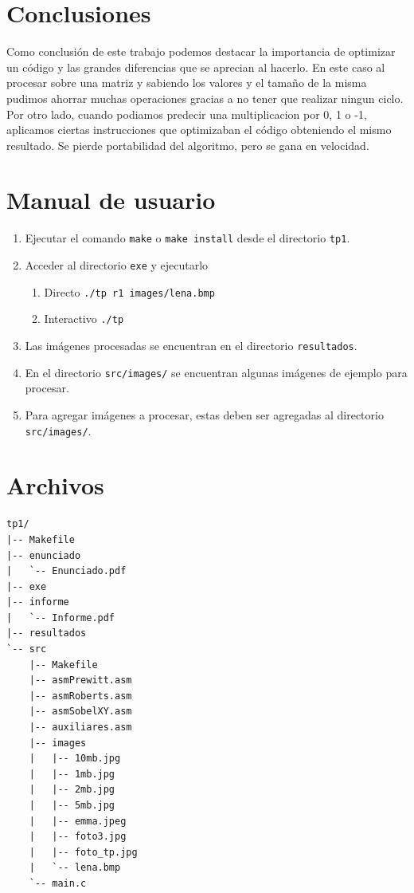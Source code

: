 \documentclass[a4paper, 10pt]{article}
\begin{document}
\newpage

\section{Conclusiones}
Como conclusi\'on de este trabajo podemos destacar la importancia de optimizar un c\'odigo y las grandes diferencias que se aprecian al hacerlo. En este caso al procesar sobre una matriz y sabiendo los valores y el tama\~no de la misma pudimos ahorrar muchas operaciones gracias a no tener que realizar ningun ciclo. 
Por otro lado, cuando podiamos predecir una multiplicacion por 0, 1 o -1, aplicamos ciertas instrucciones que optimizaban el c\'odigo obteniendo el mismo resultado.
Se pierde portabilidad del algoritmo, pero se gana en velocidad.

\newpage

\section{Manual de usuario}
\begin{enumerate}
	\item Ejecutar el comando \texttt{make} o \texttt{make install} desde el directorio \texttt{tp1}.
	\item Acceder al directorio \texttt{exe} y ejecutarlo
	\begin{enumerate}
		\item Directo \texttt{./tp r1 images/lena.bmp }
		\item Interactivo \texttt{./tp }
	\end{enumerate}	
	\item Las im\'agenes procesadas se encuentran en el directorio \texttt{resultados}.
	\item En el directorio \texttt{src/images/} se encuentran algunas im\'agenes de ejemplo para procesar.
	\item Para agregar im\'agenes a procesar, estas deben ser agregadas al directorio \texttt{src/images/}.

\end{enumerate}

\section*{Archivos}
\begin{lstlisting}[language=SHELXL]
tp1/
|-- Makefile
|-- enunciado
|   `-- Enunciado.pdf
|-- exe
|-- informe
|   `-- Informe.pdf
|-- resultados
`-- src
    |-- Makefile
    |-- asmPrewitt.asm
    |-- asmRoberts.asm
    |-- asmSobelXY.asm
    |-- auxiliares.asm
    |-- images
    |   |-- 10mb.jpg
    |   |-- 1mb.jpg
    |   |-- 2mb.jpg
    |   |-- 5mb.jpg
    |   |-- emma.jpeg
    |   |-- foto3.jpg
    |   |-- foto_tp.jpg
    |   `-- lena.bmp
    `-- main.c	
\end{lstlisting}
\end{document}
